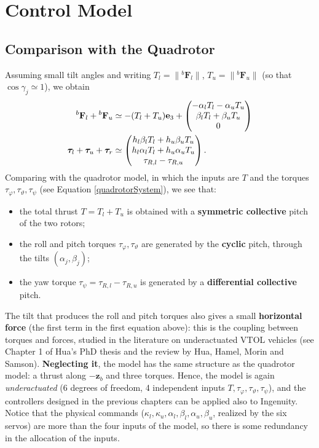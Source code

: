 \documentclass[10pt, a4paper]{report}
\begin{document}
\section{Control Model}
\subsection{Comparison with the Quadrotor}
Assuming small tilt angles and writing $T_l=\|{}^b\mathbf F_l\|$, $T_u=\|{}^b\mathbf F_u\|$ (so that $\cos\gamma_j\simeq1$), we obtain\begin{align}
    {}^b\mathbf F_l+{}^b\mathbf F_u&\simeq-(T_l+T_u)\mathbf e_3+\begin{pmatrix}-\alpha_lT_l-\alpha_uT_u\\ \beta_lT_l+\beta_uT_u\\ 0\end{pmatrix}\\
    {\boldsymbol{\tau}}_l+{\boldsymbol{\tau}}_u+{\boldsymbol{\tau}}_r&\simeq\begin{pmatrix}h_l\beta_lT_l+h_u\beta_uT_u\\ h_l\alpha_lT_l+h_u\alpha_uT_u\\ \tau_{R,l}-\tau_{R,u}\end{pmatrix}.
\end{align}
Comparing with the quadrotor model, in which the inputs are $T$ and the torques $\tau_\varphi,\tau_\vartheta,\tau_\psi$ (see Equation \eqref{quadrotorSystem}), we see that:
\begin{itemize}
    \item the total thrust $T=T_l+T_u$ is obtained with a \textbf{symmetric collective} pitch of the two rotors;
    \item the roll and pitch torques $\tau_\varphi,\tau_\vartheta$ are generated by the \textbf{cyclic} pitch, through the tilts $(\alpha_j,\beta_j)$;
    \item the yaw torque $\tau_\psi=\tau_{R,l}-\tau_{R,u}$ is generated by a \textbf{differential collective} pitch.
\end{itemize}
\begin{boxobservation}{}{}
The tilt that produces the roll and pitch torques also gives a small \textbf{horizontal force} (the first term in the first equation above): this is the coupling between torques and forces, studied in the literature on underactuated VTOL vehicles (see Chapter 1 of Hua's PhD thesis and the review by Hua, Hamel, Morin and Samson). \textbf{Neglecting it}, the model has the same structure as the quadrotor model: a thrust along $-\mathbf z_b$ and three torques. Hence, the model is again \textit{underactuated} (6 degrees of freedom, 4 independent inputs $T,\tau_\varphi,\tau_\vartheta,\tau_\psi$), and the controllers designed in the previous chapters can be applied also to Ingenuity. Notice that the physical commands ($\kappa_l,\kappa_u,\alpha_l,\beta_l,\alpha_u,\beta_u$, realized by the six servos) are more than the four inputs of the model, so there is some redundancy in the allocation of the inputs.
\end{boxobservation}
\end{document}

